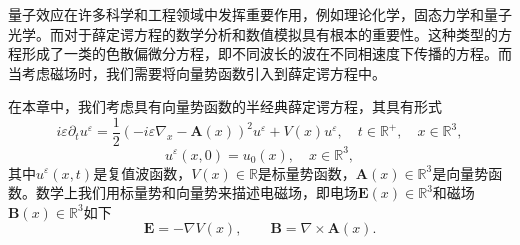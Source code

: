 

量子效应在许多科学和工程领域中发挥重要作用，例如理论化学，固态力学和量子光学。而对于薛定谔方程的数学分析和数值模拟具有根本的重要性。这种类型的方程形成了一类的色散偏微分方程，即不同波长的波在不同相速度下传播的方程。而当考虑磁场时，我们需要将向量势函数引入到薛定谔方程中。

在本章中，我们考虑具有向量势函数的半经典薛定谔方程，其具有形式
\begin{equation} \label{eq:main1}
i\varepsilon\partial_{t}u^{\varepsilon}=\frac{1}{2}\left(-i\varepsilon\nabla_x-\mathbf{A}(x)\right)^{2}u^{\varepsilon}+V(x)u^{\varepsilon},\quad t\in\mathbb{R}^{+},\quad x\in\mathbb{R}^{3},
\end{equation}
\begin{equation}
u^{\varepsilon}({x},0)=u_{0}({x}),\quad x \in\mathbb{R}^{3}\label{eq:initial cond},
\end{equation}
其中$u^{\varepsilon}({x},t)$是复值波函数，$V({x})\in\mathbb{R}$是标量势函数，$\mathbf{A}({x})\in\mathbb{R}^{3}$是向量势函数。数学上我们用标量势和向量势来描述电磁场，即电场$\mathbf{E}({x})\in\mathbb{R}^{3}$和磁场$\mathbf{B}({x})\in\mathbb{R}^{3}$如下
\begin{equation}
\mathbf{E}=-\nabla V(x),\qquad\mathbf{B}=\nabla\times\mathbf{A}\left( x \right).
\end{equation}


